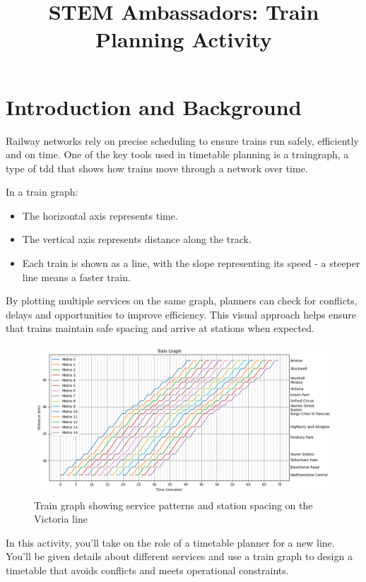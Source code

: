 \documentclass[a4paper]{article}
\title{STEM Ambassadors: Train Planning Activity}
\begin{document}
	\maketitle
	\thispagestyle{fancy}
	
	\section{Introduction and Background}
	
	Railway networks rely on precise scheduling to ensure trains run safely, efficiently and on time. One of the key tools used in timetable planning is a \gls{traingraph}, a type of \gls{tdd} that shows how trains move through a network over time.
	
	In a train graph:
	\begin{itemize}
		\item The horizontal axis represents time.
		\item The vertical axis represents distance along the track.
		\item Each train is shown as a line, with the slope representing its speed - a steeper line means a faster train.
	\end{itemize}
	
	By plotting multiple services on the same graph, planners can check for conflicts, delays and opportunities to improve efficiency. This visual approach helps ensure that trains maintain safe spacing and arrive at stations when expected.
	
	\begin{figure}[h]
		\centering
		\includegraphics[width=\textwidth]{../train-generator/victoria.png}
		\caption{Train graph showing service patterns and station spacing on the Victoria line}
		\label{fig:vic-train-graph}
	\end{figure}
	
	In this activity, you'll take on the role of a timetable planner for a new line. You'll be given details about different services and use a train graph to design a timetable that avoids conflicts and meets operational constraints.
	
\end{document}
